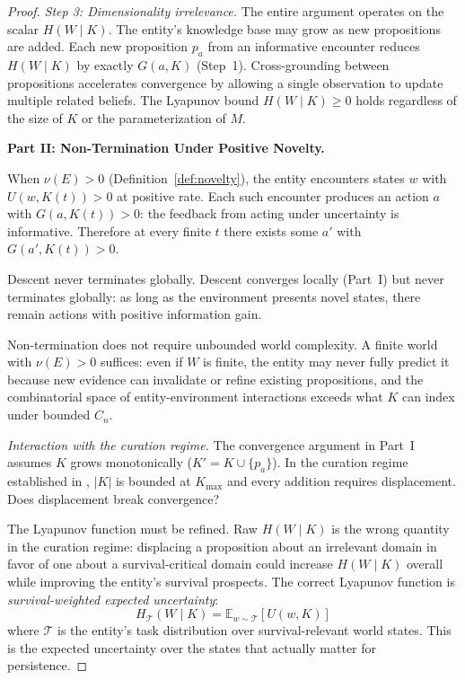 \documentclass[11pt]{article}
\theoremstyle{definition}
\begin{document}
\begin{proof}
\emph{Step 3: Dimensionality irrelevance.} The entire argument
operates on the scalar $H(W \mid K)$. The entity's knowledge base may
grow as new propositions are added. Each new proposition $p_a$ from an
informative encounter reduces $H(W \mid K)$ by exactly $G(a, K)$
(Step~1). Cross-grounding between propositions accelerates convergence
by allowing a single observation to update multiple related beliefs.
The Lyapunov bound $H(W \mid K) \geq 0$ holds regardless of the
size of $K$ or the parameterization of $M$.

\textbf{Part II: Non-Termination Under Positive Novelty.}

When $\nu(E) > 0$ (Definition~\ref{def:novelty}), the entity
encounters states $w$ with $U(w, K(t)) > 0$ at positive rate. Each
such encounter produces an action $a$ with $G(a, K(t)) > 0$: the
feedback from acting under uncertainty is informative. Therefore at
every finite $t$ there exists some $a'$ with $G(a', K(t)) > 0$.

Descent never terminates globally. Descent converges locally
(Part~I) but never terminates globally: as long as the environment
presents novel states, there remain actions with positive information
gain.

Non-termination does not require unbounded world complexity. A finite
world with $\nu(E) > 0$ suffices: even if $W$ is finite, the entity
may never fully predict it because new evidence can invalidate or
refine existing propositions, and the combinatorial space of
entity-environment interactions exceeds what $K$ can index under
bounded $C_n$.

\emph{Interaction with the curation regime.} The convergence argument
in Part~I assumes $K$ grows monotonically ($K' = K \cup \{p_a\}$). In
the curation regime established in \cite{McCarthy2026c}, $|K|$ is
bounded at $K_{\max}$ and every addition requires displacement. Does
displacement break convergence?

The Lyapunov function must be refined. Raw $H(W \mid K)$ is the wrong
quantity in the curation regime: displacing a proposition about an
irrelevant domain in favor of one about a survival-critical domain
could increase $H(W \mid K)$ overall while improving the entity's
survival prospects. The correct Lyapunov function is
\emph{survival-weighted expected uncertainty}:
\[
H_{\mathcal{T}}(W \mid K) = \mathbb{E}_{w \sim \mathcal{T}}[U(w, K)]
\]
where $\mathcal{T}$ is the entity's task distribution over
survival-relevant world states. This is the expected uncertainty over
the states that actually matter for persistence.


\end{proof}
\end{document}
